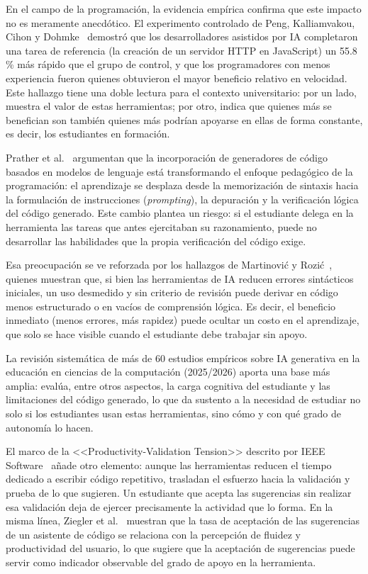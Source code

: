 \documentclass[12pt,a4paper,oneside]{report}
\begin{document}
En el campo de la programación, la evidencia empírica confirma que este impacto no es meramente anecdótico. El experimento controlado de Peng, Kalliamvakou, Cihon y Dohmke~\cite{peng2023} demostró que los desarrolladores asistidos por IA completaron una tarea de referencia (la creación de un servidor HTTP en JavaScript) un 55.8\,\% más rápido que el grupo de control, y que los programadores con menos experiencia fueron quienes obtuvieron el mayor beneficio relativo en velocidad. Este hallazgo tiene una doble lectura para el contexto universitario: por un lado, muestra el valor de estas herramientas; por otro, indica que quienes más se benefician son también quienes más podrían apoyarse en ellas de forma constante, es decir, los estudiantes en formación.

Prather et al.~\cite{prather2023} argumentan que la incorporación de generadores de código basados en modelos de lenguaje está transformando el enfoque pedagógico de la programación: el aprendizaje se desplaza desde la memorización de sintaxis hacia la formulación de instrucciones (\textit{prompting}), la depuración y la verificación lógica del código generado. Este cambio plantea un riesgo: si el estudiante delega en la herramienta las tareas que antes ejercitaban su razonamiento, puede no desarrollar las habilidades que la propia verificación del código exige.

Esa preocupación se ve reforzada por los hallazgos de Martinović y Rozić~\cite{martinovic2024}, quienes muestran que, si bien las herramientas de IA reducen errores sintácticos iniciales, un uso desmedido y sin criterio de revisión puede derivar en código menos estructurado o en vacíos de comprensión lógica. Es decir, el beneficio inmediato (menos errores, más rapidez) puede ocultar un costo en el aprendizaje, que solo se hace visible cuando el estudiante debe trabajar sin apoyo.

La revisión sistemática de más de 60 estudios empíricos sobre IA generativa en la educación en ciencias de la computación (2025/2026) \cite{r4,r5,r6,r7,r8,r9,r10,r11} aporta una base más amplia: evalúa, entre otros aspectos, la carga cognitiva del estudiante y las limitaciones del código generado, lo que da sustento a la necesidad de estudiar no solo si los estudiantes usan estas herramientas, sino cómo y con qué grado de autonomía lo hacen.

El marco de la <<Productivity-Validation Tension>> descrito por IEEE Software~\cite{ieee2024} añade otro elemento: aunque las herramientas reducen el tiempo dedicado a escribir código repetitivo, trasladan el esfuerzo hacia la validación y prueba de lo que sugieren. Un estudiante que acepta las sugerencias sin realizar esa validación deja de ejercer precisamente la actividad que lo forma. En la misma línea, Ziegler et al.~\cite{ziegler2022} muestran que la tasa de aceptación de las sugerencias de un asistente de código se relaciona con la percepción de fluidez y productividad del usuario, lo que sugiere que la aceptación de sugerencias puede servir como indicador observable del grado de apoyo en la herramienta.
\end{document}
